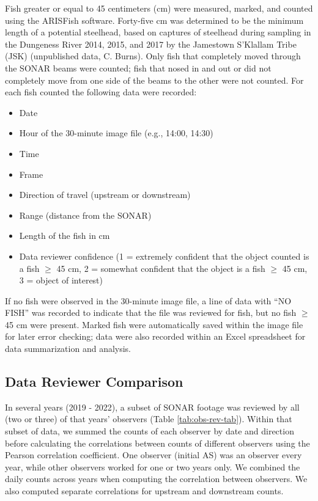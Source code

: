 \documentclass[
]{article}
\providecommand{\tightlist}{%
  \setlength{\itemsep}{0pt}\setlength{\parskip}{0pt}}
\begin{document}
Fish greater or equal to 45 centimeters (cm) were measured, marked, and counted using the ARISFish software. Forty-five cm was determined to be the minimum length of a potential steelhead, based on captures of steelhead during sampling in the Dungeness River 2014, 2015, and 2017 by the Jamestown S'Klallam Tribe (JSK) (unpublished data, C. Burns). Only fish that completely moved through the SONAR beams were counted; fish that nosed in and out or did not completely move from one side of the beams to the other were not counted. For each fish counted the following data were recorded:

\begin{itemize}
\tightlist
\item
  Date
\item
  Hour of the 30-minute image file (e.g., 14:00, 14:30)
\item
  Time
\item
  Frame
\item
  Direction of travel (upstream or downstream)
\item
  Range (distance from the SONAR)
\item
  Length of the fish in cm
\item
  Data reviewer confidence (1 = extremely confident that the object counted is a fish \(\geq\) 45 cm, 2 = somewhat confident that the object is a fish \(\geq\) 45 cm, 3 = object of interest)
\end{itemize}

If no fish were observed in the 30-minute image file, a line of data with ``NO FISH'' was recorded to indicate that the file was reviewed for fish, but no fish \(\geq\) 45 cm were present. Marked fish were automatically saved within the image file for later error checking; data were also recorded within an Excel spreadsheet for data summarization and analysis.

\hypertarget{data-reviewer-comparison}{%
\subsection{Data Reviewer Comparison}\label{data-reviewer-comparison}}

In several years (2019 - 2022), a subset of SONAR footage was reviewed by all (two or three) of that years' observers (Table \ref{tab:obs-rev-tab}). Within that subset of data, we summed the counts of each observer by date and direction before calculating the correlations between counts of different observers using the Pearson correlation coefficient. One observer (initial AS) was an observer every year, while other observers worked for one or two years only. We combined the daily counts across years when computing the correlation between observers. We also computed separate correlations for upstream and downstream counts.
\end{document}
